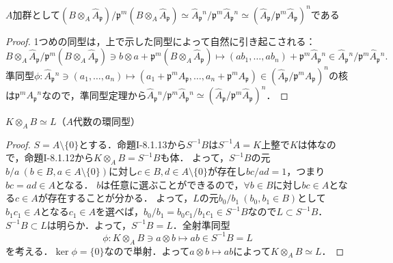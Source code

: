 \begin{screen}
  $A$加群として$(B\otimes_A\widehat{A}_\mathfrak{p})/\mathfrak{p}^m(B\otimes_A\widehat{A}_\mathfrak{p}) \simeq \widehat{A}_\mathfrak{p}{}^n/\mathfrak{p}^m\widehat{A}_\mathfrak{p}{}^n \simeq (\widehat{A}_\mathfrak{p}/\mathfrak{p}^m\widehat{A}_\mathfrak{p})^n$である
\end{screen}
\begin{proof}
  1つめの同型は，上で示した同型によって自然に引き起こされる：
  \[B\otimes_A\widehat{A}_\mathfrak{p}/\mathfrak{p}^m(B\otimes_A\widehat{A}_\mathfrak{p}) \ni b\otimes a + \mathfrak{p}^m(B\otimes_A\widehat{A}_\mathfrak{p}) \mapsto  (ab_1, \ldots, ab_n) + \mathfrak{p}^m\widehat{A}_\mathfrak{p}{}^n \in \widehat{A}_\mathfrak{p}{}^n/\mathfrak{p}^m\widehat{A}_\mathfrak{p}{}^n.\]
  準同型$\phi\colon \widehat{A}_\mathfrak{p}{}^n\ni(a_1, \ldots, a_n)\mapsto(a_1 + \mathfrak{p}^mA_\mathfrak{p}, \ldots, a_n + \mathfrak{p}^mA_\mathfrak{p})\in(\widehat{A}_\mathfrak{p}/\mathfrak{p}^mA_\mathfrak{p})^n$の核は$\mathfrak{p}^mA_\mathfrak{p}{}^n$なので，準同型定理から$\widehat{A}_\mathfrak{p}{}^n/\mathfrak{p}^m\widehat{A}_\mathfrak{p}{}^n\simeq(\widehat{A}_\mathfrak{p}/\mathfrak{p}^m\widehat{A}_\mathfrak{p})^n$．
\end{proof}

\begin{screen}
  $K\otimes_AB\simeq L$（$A$代数の環同型）
\end{screen}
\begin{proof}
  $S = A\setminus\{0\}$とする．命題I-8.1.13から$S^{-1}B$は$S^{-1}A = K$上整で$K$は体なので，命題I-8.1.12から$K\otimes_AB = S^{-1}B$も体．
  よって，$S^{-1}B$の元$b/a ~ (b\in B, a\in A\setminus\{0\})$に対し$c\in B, d\in A\setminus\{0\}$が存在し$bc/ad = 1$，つまり$bc = ad\in A$となる．
  $b$は任意に選ぶことができるので，$\forall b\in B$に対し$bc\in A$となる$c\in A$が存在することが分かる．
  よって，$L$の元$b_0/b_1\ (b_0, b_1\in B)$として$b_1c_1\in A$となる$c_1\in A$を選べば，$b_0/b_1 = b_0c_1/b_1c_1\in S^{-1}B$なので$L\subset S^{-1}B$．
  $S^{-1}B\subset L$は明らか．よって，$S^{-1}B = L$．全射準同型
  \[\phi\colon K\otimes_AB\ni a\otimes b\mapsto ab\in S^{-1}B = L\]
  を考える．$\ker\phi = \{0\}$なので単射．よって$a\otimes b\mapsto ab$によって$K\otimes_AB\simeq L$．
\end{proof}

